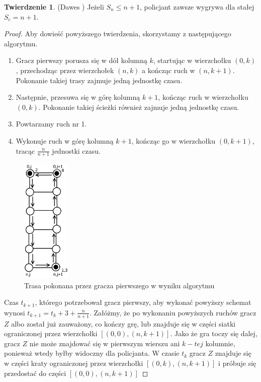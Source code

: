 \documentclass[brudnopis]{xmgr}
\theoremstyle{definition}
\newtheorem{Twierdzenie}{Twierdzenie}
\begin{document}
\begin{Twierdzenie} (Dawes \cite{poscig})
	Jeżeli $S_n \le n + 1$, policjant zawsze wygrywa dla stałej $S_c = n + 1$.
\end{Twierdzenie}
\begin{proof}
	Aby dowieść powyższego twierdzenia, skorzystamy z następującego algorytmu.
	\begin{enumerate}
		\item Gracz pierwszy porusza się w dół kolumną $k$, startując w wierzchołku $(0,k)$, przechodząc przez wierzchołek $(n, k)$ a kończąc ruch w $(n, k + 1)$. Pokonanie takiej trasy zajmuje jedną jednostkę czasu.
		\item Następnie, przesuwa się w górę kolumną $k + 1$, kończąc ruch w wierzchołku $(0,k)$. Pokonanie takiej ścieżki również zajmuje jedną jednostkę czasu.
		\item Powtarzamy ruch nr 1.
		\item Wykonuje ruch w górę kolumną $k + 1$, kończąc go w wierzchołku $(0,k + 1)$, tracąc $\frac{n}{n+1}$ jednostki czasu.
	\end{enumerate}
	\begin{figure}[ht!]
	  \centering
	  \includegraphics[height=6cm]{rysunki/schemat_ruchu.png}
	  \caption{Trasa pokonana przez gracza pierwszego w wyniku algorytmu}
	\end{figure} 

	Czas $t_{k+1}$, którego potrzebował gracz pierwszy, aby wykonać powyższy schemat wynosi $t_{k+1} = t_k + 3 + \frac{n}{n+1}$.
	Załóżmy, że po wykonaniu powyższych ruchów gracz $Z$ albo został już zauważony, co kończy grę, lub znajduje się w części siatki ograniczonej przez wierzchołki $[(0,0), (n, k + 1)]$. 
	\indent Jako że gra toczy się dalej, gracz $Z$ nie może znajdować się w pierwszym wierszu ani $k-tej$ kolumnie, ponieważ wtedy byłby widoczny dla policjanta. W czasie $t_k$ gracz $Z$ znajduje się w części kraty ograniczonej przez wierzchołki $[(0,k), (n, k + 1)]$ i próbuje się przedostać do części $[(0,0), (n, k + 1)]$ 


\end{proof}
\end{document}
